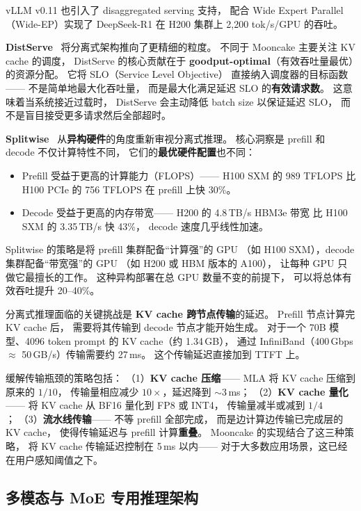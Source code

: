 vLLM v0.11 也引入了 disaggregated serving 支持，
配合 Wide Expert Parallel（Wide-EP）实现了
DeepSeek-R1 在 H200 集群上 2,200 tok/s/GPU 的吞吐。

\textbf{DistServe}~\cite{zhong2024distserve}
将分离式架构推向了更精细的粒度。
不同于 Mooncake 主要关注 KV cache 的调度，
DistServe 的核心贡献在于
\textbf{goodput-optimal}（有效吞吐量最优）的资源分配。
它将 SLO（Service Level Objective）
直接纳入调度器的目标函数——
不是简单地最大化吞吐量，
而是最大化满足延迟 SLO 的\textbf{有效请求数}。
这意味着当系统接近过载时，
DistServe 会主动降低 batch size 以保证延迟 SLO，
而不是盲目接受更多请求然后全部超时。

\textbf{Splitwise}~\cite{patel2024splitwise}
从\textbf{异构硬件}的角度重新审视分离式推理。
核心洞察是 prefill 和 decode 不仅计算特性不同，
它们的\textbf{最优硬件配置}也不同：
\begin{itemize}[noitemsep]
  \item Prefill 受益于更高的计算能力（FLOPS）——
        H100 SXM 的 989 TFLOPS 比 H100 PCIe 的 756 TFLOPS
        在 prefill 上快 30\%。
  \item Decode 受益于更高的内存带宽——
        H200 的 4.8\,TB/s HBM3e 带宽
        比 H100 SXM 的 3.35\,TB/s 快 43\%，
        decode 速度几乎线性加速。
\end{itemize}
Splitwise 的策略是将 prefill 集群配备``计算强''的 GPU
（如 H100 SXM），decode 集群配备``带宽强''的 GPU
（如 H200 或 HBM 版本的 A100），
让每种 GPU 只做它最擅长的工作。
这种异构部署在总 GPU 数量不变的前提下，
可以将总体有效吞吐提升 20--40\%。

分离式推理面临的关键挑战是
\textbf{KV cache 跨节点传输}的延迟。
Prefill 节点计算完 KV cache 后，
需要将其传输到 decode 节点才能开始生成。
对于一个 70B 模型、4096 token prompt 的 KV cache（约 1.34\,GB），
通过 InfiniBand（400\,Gbps $\approx$ 50\,GB/s）传输需要约 27\,ms。
这个传输延迟直接加到 TTFT 上。

缓解传输瓶颈的策略包括：
（1）\textbf{KV cache 压缩}——
MLA 将 KV cache 压缩到原来的 $1/10$，
传输量相应减少 $10\times$，延迟降到 $\sim$3\,ms；
（2）\textbf{KV cache 量化}——
将 KV cache 从 BF16 量化到 FP8 或 INT4，
传输量减半或减到 $1/4$；
（3）\textbf{流水线传输}——
不等 prefill 全部完成，
而是边计算边传输已完成层的 KV cache，
使得传输延迟与 prefill 计算\textbf{重叠}。
Mooncake 的实现结合了这三种策略，
将 KV cache 传输延迟控制在 5\,ms 以内——
对于大多数应用场景，这已经在用户感知阈值之下。

\subsection{多模态与 MoE 专用推理架构}

